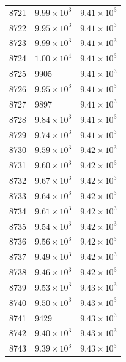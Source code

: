 \begin{table}[H]
\begin{tabular}{lll}
8721 & $\displaystyle 9.99 \times 10^{3}$ & $\displaystyle 9.41 \times 10^{3}$ \\
8722 & $\displaystyle 9.95 \times 10^{3}$ & $\displaystyle 9.41 \times 10^{3}$ \\
8723 & $\displaystyle 9.99 \times 10^{3}$ & $\displaystyle 9.41 \times 10^{3}$ \\
8724 & $\displaystyle 1.00 \times 10^{4}$ & $\displaystyle 9.41 \times 10^{3}$ \\
8725 & 9905 & $\displaystyle 9.41 \times 10^{3}$ \\
8726 & $\displaystyle 9.95 \times 10^{3}$ & $\displaystyle 9.41 \times 10^{3}$ \\
8727 & 9897 & $\displaystyle 9.41 \times 10^{3}$ \\
8728 & $\displaystyle 9.84 \times 10^{3}$ & $\displaystyle 9.41 \times 10^{3}$ \\
8729 & $\displaystyle 9.74 \times 10^{3}$ & $\displaystyle 9.41 \times 10^{3}$ \\
8730 & $\displaystyle 9.59 \times 10^{3}$ & $\displaystyle 9.42 \times 10^{3}$ \\
8731 & $\displaystyle 9.60 \times 10^{3}$ & $\displaystyle 9.42 \times 10^{3}$ \\
8732 & $\displaystyle 9.67 \times 10^{3}$ & $\displaystyle 9.42 \times 10^{3}$ \\
8733 & $\displaystyle 9.64 \times 10^{3}$ & $\displaystyle 9.42 \times 10^{3}$ \\
8734 & $\displaystyle 9.61 \times 10^{3}$ & $\displaystyle 9.42 \times 10^{3}$ \\
8735 & $\displaystyle 9.54 \times 10^{3}$ & $\displaystyle 9.42 \times 10^{3}$ \\
8736 & $\displaystyle 9.56 \times 10^{3}$ & $\displaystyle 9.42 \times 10^{3}$ \\
8737 & $\displaystyle 9.49 \times 10^{3}$ & $\displaystyle 9.42 \times 10^{3}$ \\
8738 & $\displaystyle 9.46 \times 10^{3}$ & $\displaystyle 9.42 \times 10^{3}$ \\
8739 & $\displaystyle 9.53 \times 10^{3}$ & $\displaystyle 9.43 \times 10^{3}$ \\
8740 & $\displaystyle 9.50 \times 10^{3}$ & $\displaystyle 9.43 \times 10^{3}$ \\
8741 & 9429 & $\displaystyle 9.43 \times 10^{3}$ \\
8742 & $\displaystyle 9.40 \times 10^{3}$ & $\displaystyle 9.43 \times 10^{3}$ \\
8743 & $\displaystyle 9.39 \times 10^{3}$ & $\displaystyle 9.43 \times 10^{3}$ \\

\end{tabular}
\end{table}
